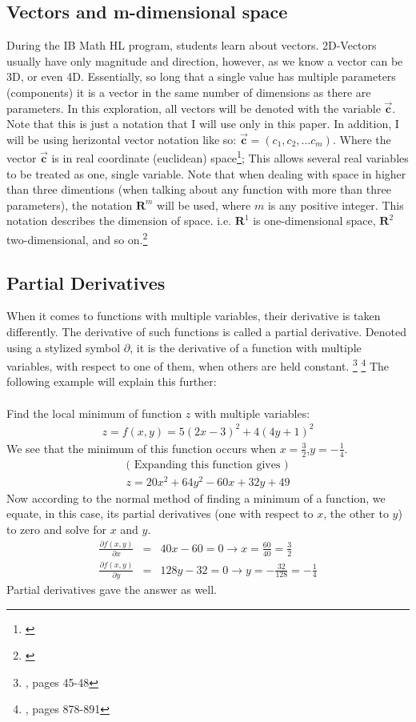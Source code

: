 \documentclass[11pt,a4paper]{article}
\numberwithin{equation}{subsection}
\newcommand{\vecc}{\vec{\textbf{c}}}
\begin{document}
\subsection{Vectors and m-dimensional space}

During the IB Math HL program, students learn about vectors. 2D-Vectors usually have only magnitude and direction, however, as we know a vector can be 3D, or even 4D. Essentially, so long that a single value has multiple parameters (components) it is a vector in the same number of dimensions as there are parameters. In this exploration, all vectors will be denoted with the variable $\vecc$. Note that this is just a notation that I will use only in this paper. In addition, I will be using herizontal vector notation like so: $\vecc=(c_{1},c_{2},\dots c_{m})$. Where the vector ${\vecc}$ is in real coordinate (euclidean) space\footnote{\cite{kelley_1995}}; This allows several real variables to be treated as one, single variable. Note that when dealing with space in higher than three dimentions (when talking about any function with more than three parameters), the notation $\boldsymbol{R}^{m}$ will be used, where $m$ is any positive integer. This notation describes the dimension of space. i.e. $\boldsymbol{R}^{1}$ is one-dimensional space, $\boldsymbol{R}^{2}$ two-dimensional, and so on.\footnote{\cite{Weisstein_2014}}
\subsection{Partial Derivatives}
When it comes to functions with multiple variables, their derivative is taken differently. The derivative of such functions is called a partial derivative. Denoted using a stylized symbol $\partial$, it is the derivative of a function with multiple variables, with respect to one of them, when others are held constant. \footnote{\cite{matthews_1998}, pages 45-48} \footnote{\cite{stewart_2008_deriv}, pages 878-891} The following example will explain this further:\\
\\
Find the local minimum of function $z$ with multiple variables:
\begin{gather*}
z = f(x,y) = 5(2x-3)^{2} + 4(4y+1)^{2}
\end{gather*}
We see that the minimum of this function occurs when $x= \frac{3}{2} $,$ y= -\frac{1}{4}$.
\begin{gather*}
\text{( Expanding this function gives )}\\
z = 20x^{2} + 64y^{2} -60x + 32y +49
\end{gather*}
Now according to the normal method of finding a minimum of a function, we equate, in this case, its partial derivatives (one with respect to $x$, the other to $y$) to zero and solve for $x$ and $y$.
\begin{eqnarray*}
\frac{\partial f(x,y)}{\partial x}  &=&  40x-60 = 0 \rightarrow x = \frac{60}{40}=\frac{3}{2}\\
\frac{\partial f(x,y)}{\partial y}  &=&  128y-32 = 0 \rightarrow y = -\frac{32}{128}=-\frac{1}{4}
\end{eqnarray*}
Partial derivatives gave the answer as well.
\end{document}

